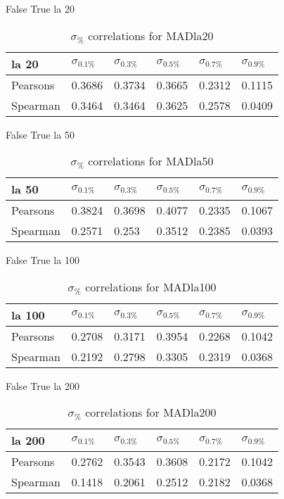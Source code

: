 \documentclass{sig-alternate}
\begin{document}
False True la 20
\begin{table}[h!]
\centering
\caption{$\sigma_{\%}$ correlations for MADla20}
\begin{tabular}{|l|l|l|l|l|l|}
\hline
la 20 & $\sigma_{0.1\%}$ & $\sigma_{0.3\%}$ & $\sigma_{0.5\%}$ & $\sigma_{0.7\%}$ & $\sigma_{0.9\%}$ \\ \hline
Pearsons  & 0.3686 & 0.3734 & 0.3665 & 0.2312 & 0.1115 \\ \hline
Spearman  & 0.3464 & 0.3464 & 0.3625 & 0.2578 & 0.0409 \\ \hline
\end{tabular}
\end{table}
False True la 50
\begin{table}[h!]
\centering
\caption{$\sigma_{\%}$ correlations for MADla50}
\begin{tabular}{|l|l|l|l|l|l|}
\hline
la 50 & $\sigma_{0.1\%}$ & $\sigma_{0.3\%}$ & $\sigma_{0.5\%}$ & $\sigma_{0.7\%}$ & $\sigma_{0.9\%}$ \\ \hline
Pearsons  & 0.3824 & 0.3698 & 0.4077 & 0.2335 & 0.1067 \\ \hline
Spearman  & 0.2571 & 0.253 & 0.3512 & 0.2385 & 0.0393 \\ \hline
\end{tabular}
\end{table}
False True la 100
\begin{table}[h!]
\centering
\caption{$\sigma_{\%}$ correlations for MADla100}
\begin{tabular}{|l|l|l|l|l|l|}
\hline
la 100 & $\sigma_{0.1\%}$ & $\sigma_{0.3\%}$ & $\sigma_{0.5\%}$ & $\sigma_{0.7\%}$ & $\sigma_{0.9\%}$ \\ \hline
Pearsons  & 0.2708 & 0.3171 & 0.3954 & 0.2268 & 0.1042 \\ \hline
Spearman  & 0.2192 & 0.2798 & 0.3305 & 0.2319 & 0.0368 \\ \hline
\end{tabular}
\end{table}
False True la 200
\begin{table}[h!]
\centering
\caption{$\sigma_{\%}$ correlations for MADla200}
\begin{tabular}{|l|l|l|l|l|l|}
\hline
la 200 & $\sigma_{0.1\%}$ & $\sigma_{0.3\%}$ & $\sigma_{0.5\%}$ & $\sigma_{0.7\%}$ & $\sigma_{0.9\%}$ \\ \hline
Pearsons  & 0.2762 & 0.3543 & 0.3608 & 0.2172 & 0.1042 \\ \hline
Spearman  & 0.1418 & 0.2061 & 0.2512 & 0.2182 & 0.0368 \\ \hline
\end{tabular}
\end{table}
\end{document}
